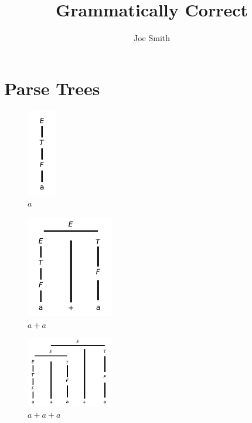 \documentclass[10pt,reqno,sumlimits]{amsart}
\theoremstyle{plain}
\theoremstyle{definition}
\newcommand{\1}{{\bf 1}}
\numberwithin{equation}{section}
\begin{document}
\title[Assignment 2]{Grammatically Correct}
\author{Joe Smith}



\maketitle



\section {Parse Trees}
\begin{figure}[htbp]
\centerline{
    \mbox{\includegraphics[height=1.5in]{figures/3_1_a.pdf}}
  }
  \caption{$a$}
  \label{fig:fit}
\end{figure}

\begin{figure}[htbp]
\centerline{
    \mbox{\includegraphics[width=1.5in]{figures/3_1_b.pdf}}
  }
  \caption{$a + a$}
  \label{fig:fit}
\end{figure}

\begin{figure}[htbp]
\centerline{
    \mbox{\includegraphics[width=1.5in]{figures/3_1_c.pdf}}
  }
  \caption{$a + a + a$}
  \label{fig:fit}
\end{figure}
\end{document}
